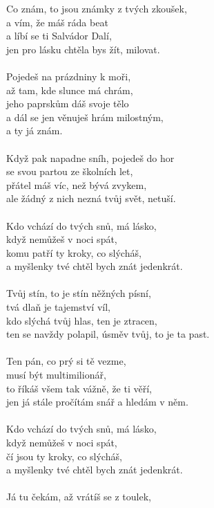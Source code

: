 \begin{multicols}{2}
Co znám, to jsou známky z tvých zkoušek,\\
a vím, že máš ráda beat\\
a líbí se ti Salvádor Dalí,\\
jen pro lásku chtěla bys žít, milovat.\\
\\
Pojedeš na prázdniny k moři,\\
až tam, kde slunce má chrám,\\
jeho paprskům dáš svoje tělo\\
a dál se jen věnuješ hrám milostným,\\
a ty já znám.\\
\\
Když pak napadne sníh, pojedeš do hor\\
se svou partou ze školních let,\\
přátel máš víc, než bývá zvykem,\\
ale žádný z nich nezná tvůj svět, netuší.\\
\\
Kdo vchází do tvých snů, má lásko,\\
když nemůžeš v noci spát,\\
komu patří ty kroky, co slýcháš,\\
a myšlenky tvé chtěl bych znát jedenkrát.\\
\\
Tvůj stín, to je stín něžných písní,\\
tvá dlaň je tajemství víl,\\
kdo slýchá tvůj hlas, ten je ztracen,\\
ten se navždy polapil, úsměv tvůj, to je ta past.\\
\columnbreak
\\
Ten pán, co prý si tě vezme,\\
musí být multimilionář,\\
to říkáš všem tak vážně, že ti věří,\\
jen já stále pročítám snář a hledám v něm.\\
\\
Kdo vchází do tvých snů, má lásko,\\
když nemůžeš v noci spát,\\
čí jsou ty kroky, co slýcháš,\\
a myšlenky tvé chtěl bych znát jedenkrát.\\
\\
Já tu čekám, až vrátíš se z toulek,\\

\end{multicols}
